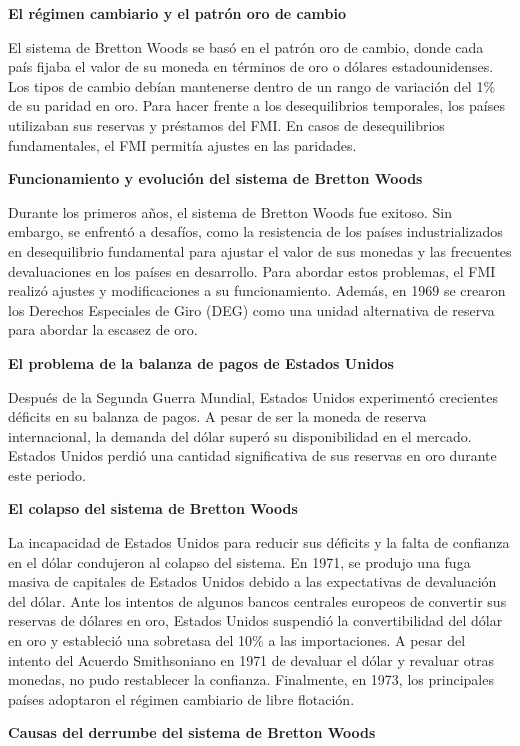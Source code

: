 \documentclass[
  letterpaper,
  DIV=11,
  numbers=noendperiod]{scrartcl}
\begin{document}
\textbf{El régimen cambiario y el patrón oro de cambio}

El sistema de Bretton Woods se basó en el patrón oro de cambio, donde
cada país fijaba el valor de su moneda en términos de oro o dólares
estadounidenses. Los tipos de cambio debían mantenerse dentro de un
rango de variación del 1\% de su paridad en oro. Para hacer frente a los
desequilibrios temporales, los países utilizaban sus reservas y
préstamos del FMI. En casos de desequilibrios fundamentales, el FMI
permitía ajustes en las paridades.

\textbf{Funcionamiento y evolución del sistema de Bretton Woods}

Durante los primeros años, el sistema de Bretton Woods fue exitoso. Sin
embargo, se enfrentó a desafíos, como la resistencia de los países
industrializados en desequilibrio fundamental para ajustar el valor de
sus monedas y las frecuentes devaluaciones en los países en desarrollo.
Para abordar estos problemas, el FMI realizó ajustes y modificaciones a
su funcionamiento. Además, en 1969 se crearon los Derechos Especiales de
Giro (DEG) como una unidad alternativa de reserva para abordar la
escasez de oro.

\textbf{El problema de la balanza de pagos de Estados Unidos}

Después de la Segunda Guerra Mundial, Estados Unidos experimentó
crecientes déficits en su balanza de pagos. A pesar de ser la moneda de
reserva internacional, la demanda del dólar superó su disponibilidad en
el mercado. Estados Unidos perdió una cantidad significativa de sus
reservas en oro durante este periodo.

\textbf{El colapso del sistema de Bretton Woods}

La incapacidad de Estados Unidos para reducir sus déficits y la falta de
confianza en el dólar condujeron al colapso del sistema. En 1971, se
produjo una fuga masiva de capitales de Estados Unidos debido a las
expectativas de devaluación del dólar. Ante los intentos de algunos
bancos centrales europeos de convertir sus reservas de dólares en oro,
Estados Unidos suspendió la convertibilidad del dólar en oro y
estableció una sobretasa del 10\% a las importaciones. A pesar del
intento del Acuerdo Smithsoniano en 1971 de devaluar el dólar y revaluar
otras monedas, no pudo restablecer la confianza. Finalmente, en 1973,
los principales países adoptaron el régimen cambiario de libre
flotación.

\textbf{Causas del derrumbe del sistema de Bretton Woods}
\end{document}
